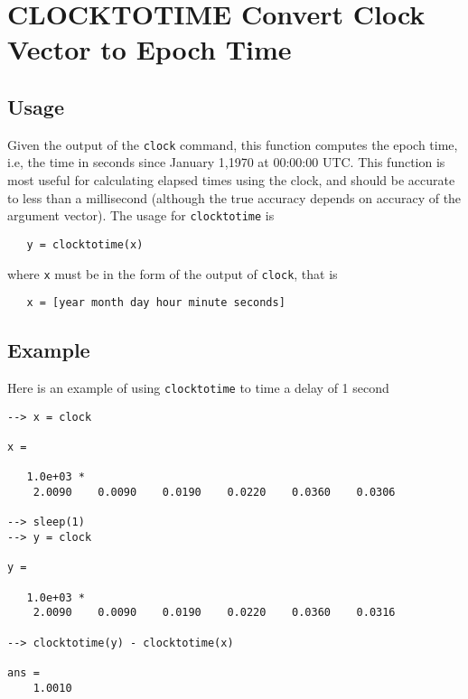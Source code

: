\section{CLOCKTOTIME Convert Clock Vector to Epoch Time}

\subsection{Usage}

Given the output of the \verb|clock| command, this function computes
the epoch time, i.e, the time in seconds since January 1,1970 
at 00:00:00 UTC.  This function is most useful for calculating elapsed
times using the clock, and should be accurate to less than a millisecond
(although the true accuracy depends on accuracy of the argument vector). 
The usage for \verb|clocktotime| is
\begin{verbatim}
   y = clocktotime(x)
\end{verbatim}
where \verb|x| must be in the form of the output of \verb|clock|, that is
\begin{verbatim}
   x = [year month day hour minute seconds]
\end{verbatim}
\subsection{Example}

Here is an example of using \verb|clocktotime| to time a delay of 1 second
\begin{verbatim}
--> x = clock

x = 

   1.0e+03 * 
    2.0090    0.0090    0.0190    0.0220    0.0360    0.0306 

--> sleep(1)
--> y = clock

y = 

   1.0e+03 * 
    2.0090    0.0090    0.0190    0.0220    0.0360    0.0316 

--> clocktotime(y) - clocktotime(x)

ans = 
    1.0010 
\end{verbatim}

